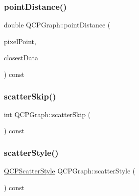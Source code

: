 \subsubsection{\texorpdfstring{pointDistance()}{pointDistance()}}
{\footnotesize\ttfamily double Q\+C\+P\+Graph\+::point\+Distance (\begin{DoxyParamCaption}\item[{const Q\+PointF \&}]{pixel\+Point,  }\item[{\mbox{\hyperlink{class_q_c_p_data_container_ae40a91f5cb0bcac61d727427449b7d15}{Q\+C\+P\+Graph\+Data\+Container\+::const\+\_\+iterator}} \&}]{closest\+Data }\end{DoxyParamCaption}) const\hspace{0.3cm}{\ttfamily [protected]}}

\mbox{\label{class_q_c_p_graph_a44487a3a706605bb9fc97ad5e05d347e}} 
\subsubsection{\texorpdfstring{scatterSkip()}{scatterSkip()}}
{\footnotesize\ttfamily int Q\+C\+P\+Graph\+::scatter\+Skip (\begin{DoxyParamCaption}{ }\end{DoxyParamCaption}) const\hspace{0.3cm}{\ttfamily [inline]}}

\mbox{\label{class_q_c_p_graph_a36d5b641db08e27527827c212542bbbd}} 
\subsubsection{\texorpdfstring{scatterStyle()}{scatterStyle()}}
{\footnotesize\ttfamily \mbox{\hyperlink{class_q_c_p_scatter_style}{Q\+C\+P\+Scatter\+Style}} Q\+C\+P\+Graph\+::scatter\+Style (\begin{DoxyParamCaption}{ }\end{DoxyParamCaption}) const\hspace{0.3cm}{\ttfamily [inline]}}

\mbox{\label{class_q_c_p_graph_abb9c674b207a1f6df5e083aa9f3e071a}} 
